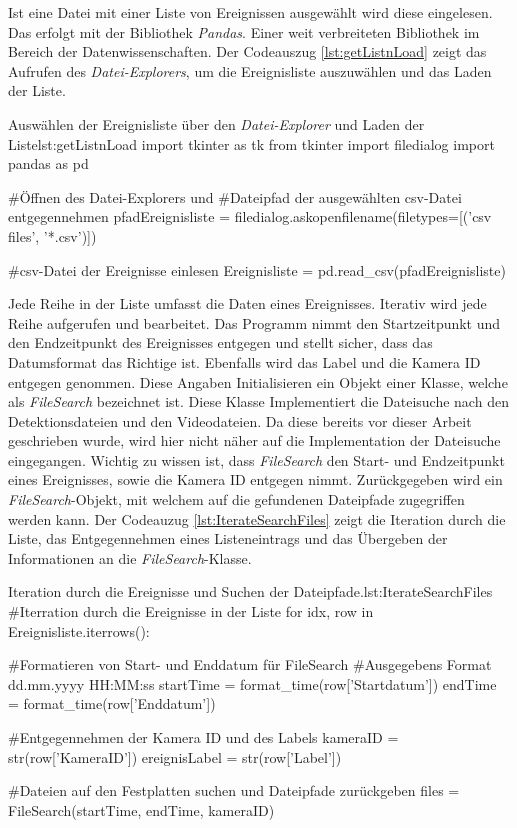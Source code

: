
Ist eine Datei mit einer Liste von Ereignissen ausgewählt wird diese eingelesen. Das erfolgt mit der Bibliothek \textit{Pandas}. Einer weit verbreiteten Bibliothek im Bereich der Datenwissenschaften. Der Codeauszug \ref{lst:getListnLoad} zeigt das Aufrufen des \textit{Datei-Explorers}, um die Ereignisliste auszuwählen und das Laden der Liste.

\begin{pythoncode}{Auswählen der Ereignisliste über den \textit{Datei-Explorer} und Laden der Liste}{lst:getListnLoad}
import tkinter as tk
from tkinter import filedialog
import pandas as pd

#Öffnen des Datei-Explorers und 
#Dateipfad der ausgewählten csv-Datei entgegennehmen 
pfadEreignisliste = filedialog.askopenfilename(filetypes=[('csv files', '*.csv')])   

#csv-Datei der Ereignisse einlesen  
Ereignisliste = pd.read_csv(pfadEreignisliste)
\end{pythoncode}

Jede Reihe in der Liste umfasst die Daten eines Ereignisses. Iterativ wird jede Reihe aufgerufen und bearbeitet. Das Programm nimmt den Startzeitpunkt und den Endzeitpunkt des Ereignisses entgegen und stellt sicher, dass das Datumsformat das Richtige ist. Ebenfalls wird das Label und die Kamera ID entgegen genommen. Diese Angaben Initialisieren ein Objekt einer Klasse, welche als \textit{FileSearch} bezeichnet ist. Diese Klasse Implementiert die Dateisuche nach den Detektionsdateien und den Videodateien. Da diese bereits vor dieser Arbeit geschrieben wurde, wird hier nicht näher auf die Implementation der Dateisuche eingegangen. Wichtig zu wissen ist, dass \textit{FileSearch} den Start- und Endzeitpunkt eines Ereignisses, sowie die Kamera ID entgegen nimmt. Zurückgegeben wird ein \textit{FileSearch}-Objekt, mit welchem auf die gefundenen Dateipfade zugegriffen werden kann. Der Codeauzug \ref{lst:IterateSearchFiles} zeigt die Iteration durch die Liste, das Entgegennehmen eines Listeneintrags und das Übergeben der Informationen an die \textit{FileSearch}-Klasse.

\begin{pythoncode}{Iteration durch die Ereignisse und Suchen der Dateipfade.}{lst:IterateSearchFiles}
#Iterration durch die Ereignisse in der Liste
for idx, row in Ereignisliste.iterrows():  
    
    #Formatieren von  Start- und Enddatum für FileSearch
    #Ausgegebens Format dd.mm.yyyy HH:MM:ss
    startTime = format_time(row['Startdatum'])
    endTime = format_time(row['Enddatum'])

    #Entgegennehmen der Kamera ID und des Labels
    kameraID = str(row['KameraID'])
    ereignisLabel = str(row['Label'])

    #Dateien auf den Festplatten suchen und Dateipfade zurückgeben 
    files = FileSearch(startTime, endTime, kameraID)
\end{pythoncode}

